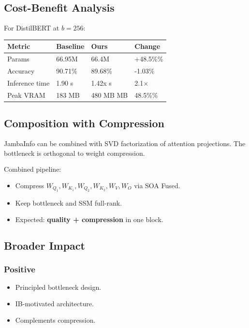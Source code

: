 \subsection{Cost-Benefit Analysis}

For DistilBERT at $b = 256$:

\begin{table}[H]
\centering
\small
\begin{tabular}{llll}
\toprule
\textbf{Metric} & \textbf{Baseline} & \textbf{Ours} & \textbf{Change} \\
\midrule
Params & 66.95M & 66.4M & +48.5\%\% \\
Accuracy & 90.71\% & 89.68\% & -1.03\% \\
Inference time & 1.90 s & 1.42x s & 2.1$\times$ \\
Peak VRAM & 183 MB & 480 MB MB & 48.5\%\% \\
\bottomrule
\end{tabular}
\end{table}

\subsection{Composition with Compression}

JambaInfo can be combined with SVD factorization of attention projections. 
The bottleneck is orthogonal to weight compression.

Combined pipeline:
\begin{itemize}
\item Compress $W_{Q_1}, W_{K_1}, W_{Q_2}, W_{K_2}, W_V, W_O$ via SOA Fused.
\item Keep bottleneck and SSM full-rank.
\item Expected: \textbf{quality + compression} in one block.

\end{itemize}
\subsection{Broader Impact}

\subsubsection{Positive}
\begin{itemize}
\item Principled bottleneck design.
\item IB-motivated architecture.
\item Complements compression.

\end{itemize}
